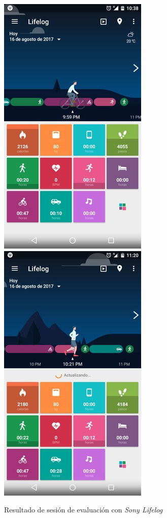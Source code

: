 \begin{figure}
\begin{centering}
\includegraphics[scale=0.7]{capitulo-6/graphics/lifelog1} \includegraphics[scale=0.7]{capitulo-6/graphics/lifelog2}
\par\end{centering}
\caption[Evaluación con aplicación \emph{Sony Lifelog}]{\label{fig6:vlifelog}Resultado de sesión de evaluación con \emph{Sony
Lifelog}}

\end{figure}

